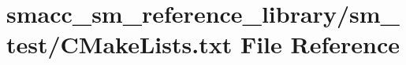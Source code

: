 \hypertarget{sm__reference__library_2sm__test_2CMakeLists_8txt}{}\section{smacc\+\_\+sm\+\_\+reference\+\_\+library/sm\+\_\+test/\+C\+Make\+Lists.txt File Reference}
\label{sm__reference__library_2sm__test_2CMakeLists_8txt}
